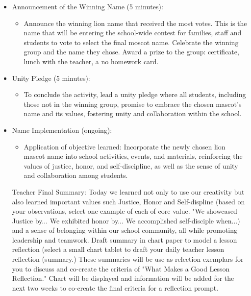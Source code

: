 \documentclass[14pt, letterpaper, twoside]{article}
\begin{document}
\begin{itemize}
\begin{itemize}
\begin{itemize}
    		\end{itemize}
    		\item Announcement of the Winning Name (5 minutes):
		\begin{itemize}
    		\item Announce the winning lion name that received the most votes. This is the name that will be entering 				the school-wide contest for families, staff and students to vote to select the final moscot name. 						Celebrate the winning group and the name they chose. Award a prize to the group: certificate, lunch with the teacher, a no homework card.
    		\end{itemize}
		\item Unity Pledge (5 minutes):
		\begin{itemize}
    		\item To conclude the activity, lead a unity pledge where all students, including those not in the winning 		group, promise to embrace the chosen mascot's name and its values, fostering unity and collaboration 					within the school.
    		\end{itemize}
		\item Name Implementation (ongoing):
		\begin{itemize}
    		\item Application of objective learned: Incorporate the newly chosen lion mascot name into school 						activities, events, and materials, reinforcing the values of justice, honor, and self-discipline, as well 				as the sense of unity and collaboration among students. 
    		\end{itemize}
    		
Teacher Final Summary: Today we learned not only to use our creativity but also learned important values such Justice, Honor and Self-displine (based on your observations, select one example of each of  core value. "We showcased Justice by... We exhibited honor by... We accomplished self-disciple when...) and a sense of belonging within our school community, all while promoting leadership and teamwork. Draft summary in chart paper to model a lesson reflection (select a small chart tablet to draft your daily teacher lesson reflection (summary.) These summaries will be use as relection exemplars for you to discuss and co-create the criteria of "What Makes a Good Lesson Reflection." Chart will be displayed and information will be added for the next two weeks to co-create the final criteria for a reflection prompt.
		\end{itemize}
    
	\end{itemize}
\end{document}
